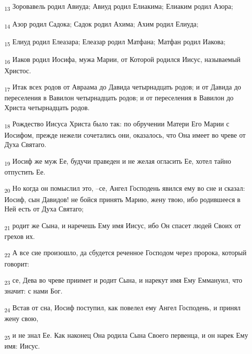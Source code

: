 \begin{tcolorbox}
\textsubscript{13} Зоровавель родил Авиуда; Авиуд родил Елиакима; Елиаким родил Азора;
\end{tcolorbox}
\begin{tcolorbox}
\textsubscript{14} Азор родил Садока; Садок родил Ахима; Ахим родил Елиуда;
\end{tcolorbox}
\begin{tcolorbox}
\textsubscript{15} Елиуд родил Елеазара; Елеазар родил Матфана; Матфан родил Иакова;
\end{tcolorbox}
\begin{tcolorbox}
\textsubscript{16} Иаков родил Иосифа, мужа Марии, от Которой родился Иисус, называемый Христос.
\end{tcolorbox}
\begin{tcolorbox}
\textsubscript{17} Итак всех родов от Авраама до Давида четырнадцать родов; и от Давида до переселения в Вавилон четырнадцать родов; и от переселения в Вавилон до Христа четырнадцать родов.
\end{tcolorbox}
\begin{tcolorbox}
\textsubscript{18} Рождество Иисуса Христа было так: по обручении Матери Его Марии с Иосифом, прежде нежели сочетались они, оказалось, что Она имеет во чреве от Духа Святаго.
\end{tcolorbox}
\begin{tcolorbox}
\textsubscript{19} Иосиф же муж Ее, будучи праведен и не желая огласить Ее, хотел тайно отпустить Ее.
\end{tcolorbox}
\begin{tcolorbox}
\textsubscript{20} Но когда он помыслил это, --се, Ангел Господень явился ему во сне и сказал: Иосиф, сын Давидов! не бойся принять Марию, жену твою, ибо родившееся в Ней есть от Духа Святаго;
\end{tcolorbox}
\begin{tcolorbox}
\textsubscript{21} родит же Сына, и наречешь Ему имя Иисус, ибо Он спасет людей Своих от грехов их.
\end{tcolorbox}
\begin{tcolorbox}
\textsubscript{22} А все сие произошло, да сбудется реченное Господом через пророка, который говорит:
\end{tcolorbox}
\begin{tcolorbox}
\textsubscript{23} се, Дева во чреве приимет и родит Сына, и нарекут имя Ему Еммануил, что значит: с нами Бог.
\end{tcolorbox}
\begin{tcolorbox}
\textsubscript{24} Встав от сна, Иосиф поступил, как повелел ему Ангел Господень, и принял жену свою,
\end{tcolorbox}
\begin{tcolorbox}
\textsubscript{25} и не знал Ее. Как наконец Она родила Сына Своего первенца, и он нарек Ему имя: Иисус.
\end{tcolorbox}
